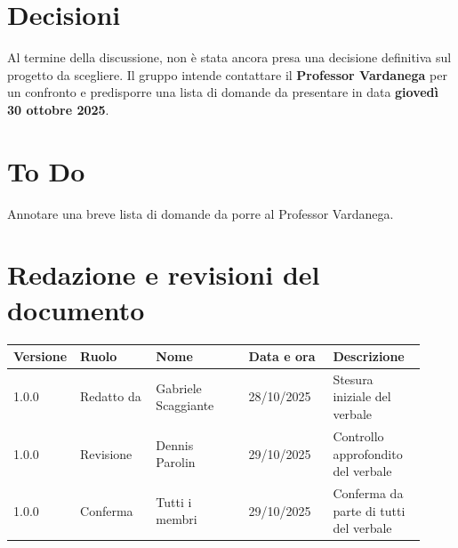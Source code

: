 \documentclass[a4paper,12pt]{article}
\begin{document}
\section{Decisioni}
Al termine della discussione, non è stata ancora presa una decisione definitiva sul progetto da scegliere.  
Il gruppo intende contattare il \textbf{Professor Vardanega} per un confronto e predisporre una lista di domande da presentare in data \textbf{giovedì 30 ottobre 2025}.

\section{To Do}
Annotare una breve lista di domande da porre al Professor Vardanega.

\clearpage
\section{Redazione e revisioni del documento}

\begin{center}
\small
\renewcommand{\arraystretch}{1.2} 
\begin{tabular}{|p{0.1\linewidth}|p{0.18\linewidth}|p{0.22\linewidth}|p{0.20\linewidth}|p{0.22\linewidth}|}
\hline
\rowcolor{gray!60} 
\textbf{Versione} & \textbf{Ruolo} & \textbf{Nome} & \textbf{Data e ora} & \textbf{Descrizione} \\
\hline
\rowcolor{white}
1.0.0 & Redatto da & Gabriele Scaggiante & 28/10/2025 & Stesura iniziale del verbale \\
\hline
\rowcolor{gray!20}
1.0.0 & Revisione & Dennis Parolin & 29/10/2025 & Controllo approfondito del verbale \\
\hline
\rowcolor{white}
1.0.0 & Conferma & Tutti i membri & 29/10/2025 & Conferma da parte di tutti del verbale \\
\hline

\end{tabular}
\end{center}
\end{document}
